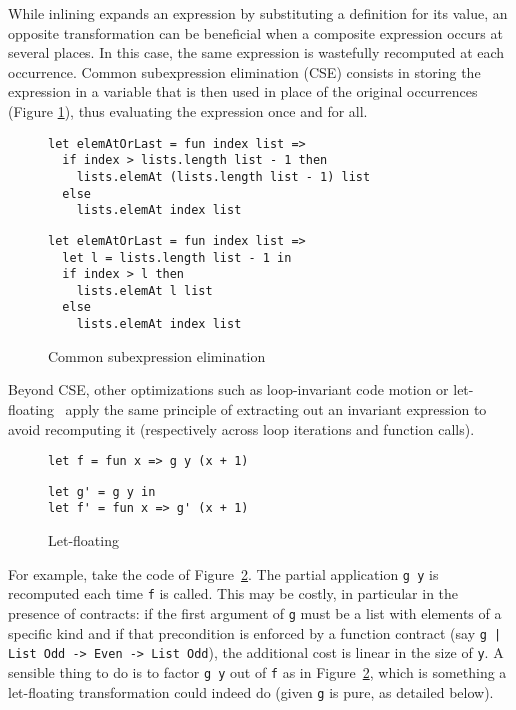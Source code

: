 \documentclass[sigplan,10pt,review,anonymous]{acmart}
\newcommand{\nickel}[1]{\lstinline[language=nickel]{#1}}
\begin{document}
While inlining expands an expression by substituting a definition for its value,
an opposite transformation can be beneficial when a composite expression occurs
at several places. In this case, the same expression is wastefully recomputed at
each occurrence. Common subexpression elimination (CSE) consists in storing the
expression in a variable that is then used in place of the original occurrences
(Figure \ref{fig:optimizations-cse-ex}), thus evaluating the expression once and
for all.

\begin{figure}[h]
  \begin{center}
\begin{lstlisting}[language=nickel,title={Source program}]
let elemAtOrLast = fun index list =>
  if index > lists.length list - 1 then
    lists.elemAt (lists.length list - 1) list
  else
    lists.elemAt index list
\end{lstlisting}
\begin{lstlisting}[language=nickel,title={Optimized program}]
let elemAtOrLast = fun index list =>
  let l = lists.length list - 1 in
  if index > l then
    lists.elemAt l list
  else
    lists.elemAt index list
\end{lstlisting}
  \end{center}
\caption{Common subexpression elimination}
\label{fig:optimizations-cse-ex}
\end{figure}

Beyond CSE, other optimizations such as loop-invariant code motion or
let-floating~\cite{letFloating} apply the same principle of extracting out an
invariant expression to avoid recomputing it (respectively across loop
iterations and function calls).

\begin{figure}
  \begin{center}
\begin{lstlisting}[language=nickel,title={Source program}]
let f = fun x => g y (x + 1)
\end{lstlisting}
\begin{lstlisting}[language=nickel,title={Optimized program}]
let g' = g y in
let f' = fun x => g' (x + 1)
\end{lstlisting}
  \end{center}
\caption{Let-floating}
\label{fig:optimizations-let-floating-ex}
\end{figure}

For example, take the code of Figure~\ref{fig:optimizations-let-floating-ex}.
The partial application \lstinline+g y+ is recomputed each time \lstinline+f+ is
called. This may be costly, in particular in the presence of contracts: if the
first argument of \lstinline+g+ must be a list with elements of a specific kind
and if that precondition is enforced by a function contract (say \nickel{g |
List Odd -> Even -> List Odd}), the additional cost is linear in the size of
\lstinline+y+. A sensible thing to do is to factor \lstinline+g y+ out of
\lstinline+f+ as in Figure~\ref{fig:optimizations-let-floating-ex}, which is
something a let-floating transformation could indeed do (given \lstinline+g+ is
pure, as detailed below).
\end{document}
